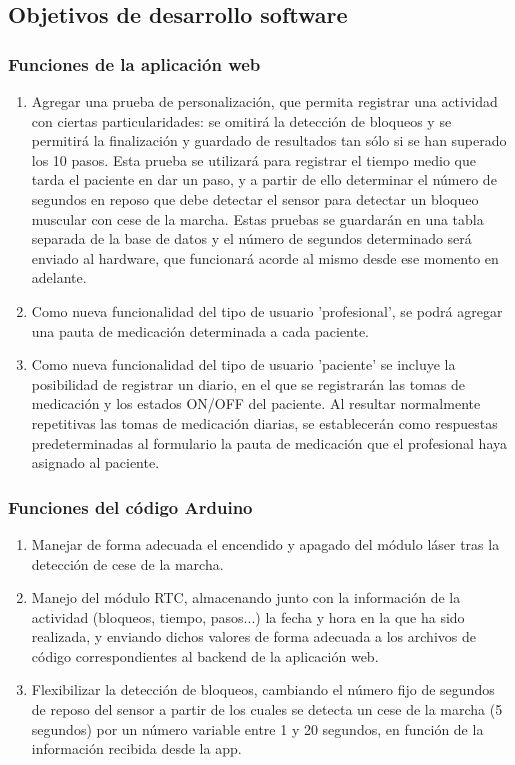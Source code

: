 \subsection{Objetivos de desarrollo software}
\subsubsection{Funciones de la aplicación web}
\begin{enumerate}
    \item Agregar una prueba de personalización, que permita registrar una actividad con ciertas particularidades: se omitirá la detección de bloqueos y se permitirá la finalización y guardado de resultados tan sólo si se han superado los 10 pasos. Esta prueba se utilizará para registrar el tiempo medio que tarda el paciente en dar un paso, y a partir de ello determinar el número de segundos en reposo que debe detectar el sensor para detectar un bloqueo muscular con cese de la marcha. 
    Estas pruebas se guardarán en una tabla separada de la base de datos y el número de segundos determinado será enviado al hardware, que funcionará acorde al mismo desde ese momento en adelante.
    \item Como nueva funcionalidad del tipo de usuario 'profesional', se podrá agregar una pauta de medicación determinada a cada paciente.
    \item Como nueva funcionalidad del tipo de usuario 'paciente' se incluye la posibilidad de registrar un diario, en el que se registrarán las tomas de medicación y los estados ON/OFF del paciente. Al resultar normalmente repetitivas las tomas de medicación diarias, se establecerán como respuestas predeterminadas al formulario la pauta de medicación que el profesional haya asignado al paciente.
\end{enumerate}
\subsubsection{Funciones del código Arduino}
\begin{enumerate}
    \item Manejar de forma adecuada el encendido y apagado del módulo láser tras la detección de cese de la marcha.
    \item Manejo del módulo RTC, almacenando junto con la información de la actividad (bloqueos, tiempo, pasos...) la fecha y hora en la que ha sido realizada, y enviando dichos valores de forma adecuada a los archivos de código correspondientes al backend de la aplicación web.
    \item Flexibilizar la detección de bloqueos, cambiando el número fijo de segundos de reposo del sensor a partir de los cuales se detecta un cese de la marcha (5 segundos) por un número variable entre 1 y 20 segundos, en función de la información recibida desde la app.
\end{enumerate}


